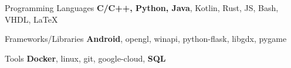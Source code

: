 

\begin{cvskills}

  \cvskill
    {Programming Languages} %
    {\textbf{C/C++, Python, Java}, Kotlin, Rust, JS, Bash, VHDL, \LaTeX} %

  \cvskill
    {Frameworks/Libraries} %
    {\textbf{Android​}, opengl, winapi, python-flask, libgdx, pygame} %

  \cvskill
    {Tools} %
    {\textbf{​Docker​}, linux, git, google-cloud, \textbf{SQL}} %

\end{cvskills}
